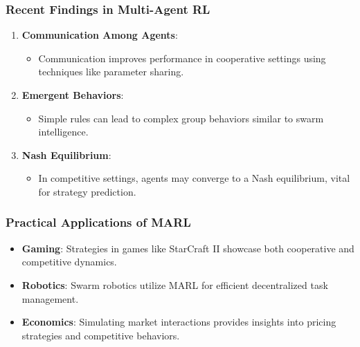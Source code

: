 \documentclass[aspectratio=169]{beamer}
\begin{document}
\begin{frame}[fragile]
    \frametitle{Recent Findings in Multi-Agent RL}
    \begin{enumerate}
        \item \textbf{Communication Among Agents}:
        \begin{itemize}
            \item Communication improves performance in cooperative settings using techniques like parameter sharing.
        \end{itemize}
        
        \item \textbf{Emergent Behaviors}:
        \begin{itemize}
            \item Simple rules can lead to complex group behaviors similar to swarm intelligence.
        \end{itemize}
        
        \item \textbf{Nash Equilibrium}:
        \begin{itemize}
            \item In competitive settings, agents may converge to a Nash equilibrium, vital for strategy prediction.
        \end{itemize}
    \end{enumerate}
\end{frame}

\begin{frame}[fragile]
    \frametitle{Practical Applications of MARL}
    \begin{itemize}
        \item \textbf{Gaming}: Strategies in games like StarCraft II showcase both cooperative and competitive dynamics.
        \item \textbf{Robotics}: Swarm robotics utilize MARL for efficient decentralized task management.
        \item \textbf{Economics}: Simulating market interactions provides insights into pricing strategies and competitive behaviors.
    \end{itemize}
\end{frame}
\end{document}
